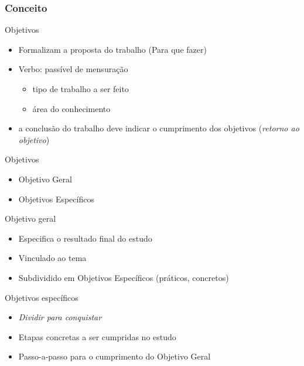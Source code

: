 \documentclass{beamer}
\begin{document}
\subsubsection{Conceito}

\begin{frame}{Objetivos}
  \begin{itemize}
    \footnotesize
  \item Formalizam a proposta do trabalho (\alert{Para que} fazer)
    \bigskip
  \item \alert{Verbo}: passível de mensuração
    \begin{itemize}
      \scriptsize
    \item tipo de trabalho a ser feito
    \item área do conhecimento
    \end{itemize}
    \bigskip
    \item a conclusão do trabalho deve indicar o cumprimento dos
      objetivos ({\em retorno ao objetivo})
  \end{itemize}
\end{frame}

\begin{frame}{Objetivos}
  \begin{itemize}
    \footnotesize
  \item Objetivo Geral
    \bigskip
  \item Objetivos Específicos
  \end{itemize}
\end{frame}

\begin{frame}{Objetivo geral}
  \begin{itemize}
    \footnotesize
  \item Especifica o resultado final do estudo
    \bigskip
  \item Vinculado ao tema
    \bigskip
  \item Subdividido em Objetivos Específicos (práticos, concretos)
  \end{itemize}
\end{frame}

\begin{frame}{Objetivos específicos}
  \begin{itemize}
    \footnotesize
  \item {\em Dividir para conquistar}
    \bigskip
  \item Etapas concretas a ser cumpridas no estudo
    \bigskip
  \item Passo-a-passo para o cumprimento do Objetivo Geral
  \end{itemize}
\end{frame}
\end{document}
